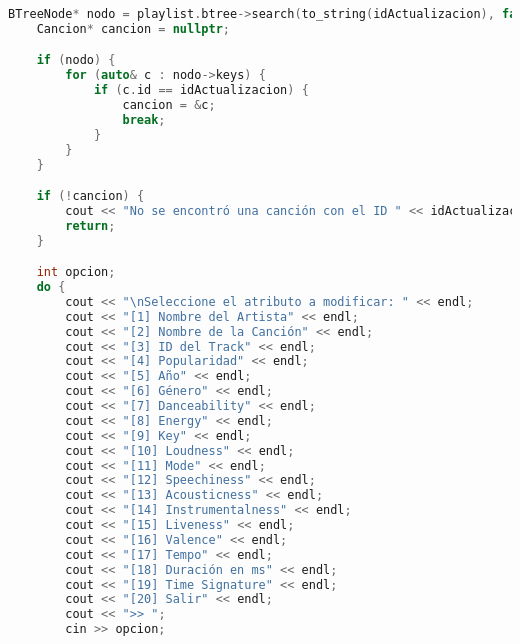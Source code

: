 \documentclass[corference]{IEEEtran}
\begin{document}
\begin{flushleft}
\begin{sloppypar}
\begin{lstlisting}[language=C++, style=mystyle, caption={Cabecera de la Clase Menú}]
    BTreeNode* nodo = playlist.btree->search(to_string(idActualizacion), false);
    Cancion* cancion = nullptr;

    if (nodo) {
        for (auto& c : nodo->keys) {
            if (c.id == idActualizacion) {
                cancion = &c;
                break;
            }
        }
    }

    if (!cancion) {
        cout << "No se encontró una canción con el ID " << idActualizacion << " para actualizar.\n";
        return;
    }

    int opcion;
    do {
        cout << "\nSeleccione el atributo a modificar: " << endl;
        cout << "[1] Nombre del Artista" << endl;
        cout << "[2] Nombre de la Canción" << endl;
        cout << "[3] ID del Track" << endl;
        cout << "[4] Popularidad" << endl;
        cout << "[5] Año" << endl;
        cout << "[6] Género" << endl;
        cout << "[7] Danceability" << endl;
        cout << "[8] Energy" << endl;
        cout << "[9] Key" << endl;
        cout << "[10] Loudness" << endl;
        cout << "[11] Mode" << endl;
        cout << "[12] Speechiness" << endl;
        cout << "[13] Acousticness" << endl;
        cout << "[14] Instrumentalness" << endl;
        cout << "[15] Liveness" << endl;
        cout << "[16] Valence" << endl;
        cout << "[17] Tempo" << endl;
        cout << "[18] Duración en ms" << endl;
        cout << "[19] Time Signature" << endl;
        cout << "[20] Salir" << endl;
        cout << ">> ";
        cin >> opcion;


\end{lstlisting}
\end{sloppypar}
\end{flushleft}
\end{document}
